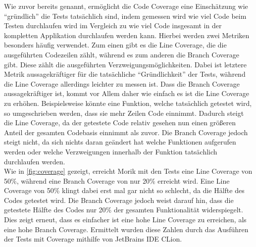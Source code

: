 Wie zuvor bereits genannt, ermöglicht die Code Coverage eine Einschätzung wie \enquote{gründlich} die Tests tatsächlich sind, indem gemessen wird wie viel Code beim Testen durchlaufen wird im Vergleich zu wie viel Code insgesamt in der kompletten Applikation durchlaufen werden kann. Hierbei werden zwei Metriken besonders häufig verwendet. Zum einen gibt es die Line Coverage, die die ausgeführten Codezeilen zählt, während es zum anderen die Branch Coverage gibt. Diese zählt die ausgeführten Verzweigungsmöglichkeiten. Dabei ist letztere Metrik aussagekräftiger für die tatsächliche \enquote{Gründlichkeit} der Tests, während die Line Coverage allerdings leichter zu messen ist. Dass die Branch Coverage aussagekräftiger ist, kommt vor Allem daher wie einfach es ist die Line Coverage zu erhöhen. Beispielsweise könnte eine Funktion, welche tatsächlich getestet wird, so umgeschrieben werden, dass sie mehr Zeilen Code einnimmt. Dadurch steigt die Line Coverage, da der getestete Code relativ gesehen nun einen größeren Anteil der gesamten Codebasis einnimmt als zuvor. Die Branch Coverage jedoch steigt nicht, da sich nichts daran geändert hat welche Funktionen aufgerufen werden oder welche Verzweigungen innerhalb der Funktion tatsächlich durchlaufen werden.\\
Wie in \autoref{fig:coverage} gezeigt, erreicht Morik mit den Tests eine Line Coverage von 50\%, während eine Branch Coverage von nur 20\% erreicht wird. Eine Line Coverage von 50\% klingt dabei erst mal gar nicht so schlecht, da die Hälfte des Codes getestet wird. Die Branch Coverage jedoch weist darauf hin, dass die getestete Hälfte des Codes nur 20\% der gesamten Funktionalität widerspiegelt. Dies zeigt erneut, dass es einfacher ist eine hohe Line Coverage zu erreichen, als eine hohe Branch Coverage. Ermittelt wurden diese Zahlen durch das Ausführen der Tests mit Coverage mithilfe von JetBrains IDE CLion.

